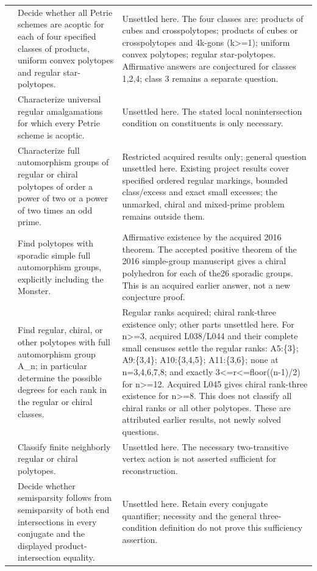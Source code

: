 \begin{longtable}{@{}>{\raggedright\arraybackslash}p{}>{\raggedright\arraybackslash}p{}>{\raggedright\arraybackslash}p{}@{}}
28 & Decide whether all Petrie schemes are acoptic for each of four specified classes of products, uniform convex polytopes and regular star-polytopes. & Unsettled here. The four classes are: products of cubes and crosspolytopes; products of cubes or crosspolytopes and 4k-gons (k>=1); uniform convex polytopes; regular star-polytopes. Affirmative answers are conjectured for classes 1,2,4; class 3 remains a separate question.\\[5pt]
29 & Characterize universal regular amalgamations for which every Petrie scheme is acoptic. & Unsettled here. The stated local nonintersection condition on constituents is only necessary.\\[5pt]
30 & Characterize full automorphism groups of regular or chiral polytopes of order a power of two or a power of two times an odd prime. & Restricted acquired results only; general question unsettled here. Existing project results cover specified ordered regular markings, bounded class/excess and exact small excesses; the unmarked, chiral and mixed-prime problem remains outside them.\\[5pt]
31 & Find polytopes with sporadic simple full automorphism groups, explicitly including the Monster. & Affirmative existence by the acquired 2016 theorem. The accepted positive theorem of the 2016 simple-group manuscript gives a chiral polyhedron for each of the26 sporadic groups. This is an acquired earlier answer, not a new conjecture proof.\\[5pt]
32 & Find regular, chiral, or other polytopes with full automorphism group A\_n; in particular determine the possible degrees for each rank in the regular or chiral classes. & Regular ranks acquired; chiral rank-three existence only; other parts unsettled here. For n>=3, acquired L038/L044 and their complete small censuses settle the regular ranks: A5:\{3\}; A9:\{3,4\}; A10:\{3,4,5\}; A11:\{3,6\}; none at n=3,4,6,7,8; and exactly 3<=r<=floor((n-1)/2) for n>=12. Acquired L045 gives chiral rank-three existence for n>=8. This does not classify all chiral ranks or all other polytopes. These are attributed earlier results, not newly solved questions.\\[5pt]
33 & Classify finite neighborly regular or chiral polytopes. & Unsettled here. The necessary two-transitive vertex action is not asserted sufficient for reconstruction.\\[5pt]
34 & Decide whether semisparsity follows from semisparsity of both end intersections in every conjugate and the displayed product-intersection equality. & Unsettled here. Retain every conjugate quantifier; necessity and the general three-condition definition do not prove this sufficiency assertion.\\[5pt]
\bottomrule
\end{longtable}
\normalsize
